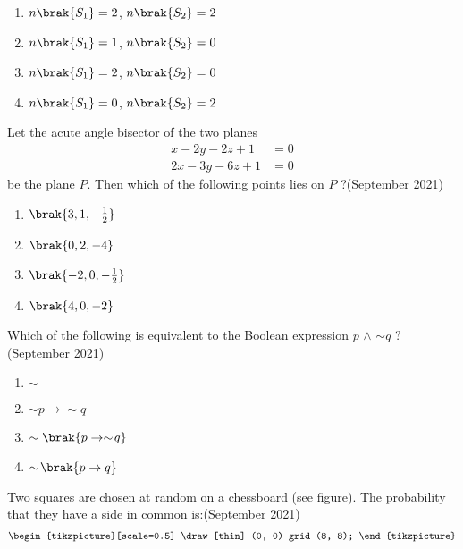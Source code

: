 \begin{multicols}{2}
    \begin{enumerate}
    \item $n\brak{S_1} = 2$, $n\brak{S_2} = 2$
    \item $n\brak{S_1} = 1$, $n\brak{S_2} = 0$
   \item $n\brak{S_1} = 2$, $n\brak{S_2} = 0$
    \item $n\brak{S_1} = 0$, $n\brak{S_2} = 2$
    \end{enumerate}
\end{multicols}

\item Let the acute angle bisector of the two planes
\begin{align*}
x - 2y - 2z + 1 &= 0 \\
2x - 3y - 6z + 1 &= 0
\end{align*}
be the plane $P$. Then which of the following points lies on $P$ ?\hfill (September 2021)
\begin{multicols}{2}
\begin{enumerate}
    \item $\brak{ 3, 1, -\frac{1}{2} }$ \\
    \item $\brak{0, 2, -4}$
     \item $\brak{ -2, 0, -\frac{1}{2} }$ \\
    \item $\brak{4, 0, -2}$
\end{enumerate}
\end{multicols}

\item Which of the following is equivalent to the Boolean expression $p$  $\land$ $\sim$$q$ ?\hfill (September 2021)
\begin{multicols}{4}
\begin{enumerate}
    \item $\sim$ 
    \item  $\sim\!p \to  \sim\!q$
    \item $\sim\brak{p \to  \sim\!q}$
    \item $\sim\!\brak{p \to q}$ 
\end{enumerate}
\end{multicols}

\item Two squares are chosen at random on a chessboard (see figure). The probability that they have a side in common is:\hfill (September 2021)
\begin{align}
\begin{tikzpicture}[scale=0.5]
    \draw[thin] (0, 0) grid (8, 8);
\end{tikzpicture}
\end{align}


